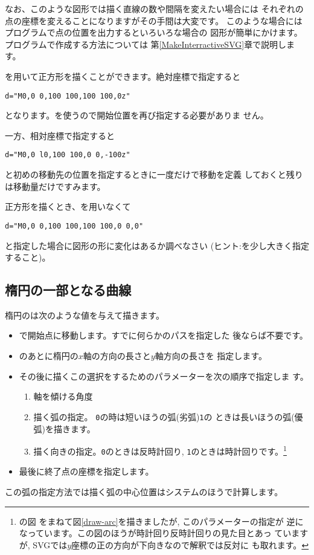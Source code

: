 なお、このような図形では描く直線の数や間隔を変えたい場合には
それぞれの点の座標を変えることになりますがその手間は大変です。
このような場合にはプログラムで点の位置を出力するといろいろな場合の
図形が簡単にかけます。プログラムで作成する方法については
第\ref{MakeInterractiveSVG}章で説明します。

を用いて正方形を描くことができます。絶対座標で指定すると
\begin{center}
 \texttt{d="M0,0 0,100 100,100 100,0z"}
\end{center}
となります。を使うので開始位置を再び指定する必要がありま
せん。

一方、相対座標で指定すると
\begin{center}
 \texttt{d="M0,0 l0,100 100,0 0,-100z"}
\end{center}
と初めの移動先の位置を指定するときに一度だけで移動を定義
しておくと残りは移動量だけですみます。
\begin{Problem}\upshape
正方形を描くとき、を用いなくて
\begin{center}
 \texttt{d="M0,0 0,100 100,100 100,0 0,0"}
\end{center}
と指定した場合に図形の形に変化はあるか調べなさい
(ヒント:を少し大きく指定すること)。
\end{Problem}
%
\subsection{楕円の一部となる曲線}
楕円のは次のような値を与えて描きます。
\begin{itemize}
 \item {}で開始点に移動します。すでに何らかのパスを指定した
       後ならば不要です。
 \item {}のあとに楕円の$x$軸の方向の長さと$y$軸方向の長さを
       指定します。
 \item その後に描くこの選択をするためのパラメーターを次の順序で指定しま
       す。
\begin{enumerate}
 \item 軸を傾ける角度
 \item 描く弧の指定。 \texttt{0}の時は短いほうの弧(劣弧)\texttt{1}の
       ときは長いほうの弧(優弧)を描きます。
 \item 描く向きの指定。\texttt{0}のときは反時計回り,
       \texttt{1}のときは時計回りです。\footnote{\cite[p.135]{Cagle}の図
       をまねて図\ref{draw-arc}を描きましたが, このパラメーターの指定が
       逆になっています。この図のほうが時計回り反時計回りの見た目とあっ
       ていますが, SVGでは$y$座標の正の方向が下向きなので解釈では反対に
       も取れます。}
\end{enumerate}
 \item 最後に終了点の座標を指定します。
\end{itemize}
この弧の指定方法では描く弧の中心位置はシステムのほうで計算します。

